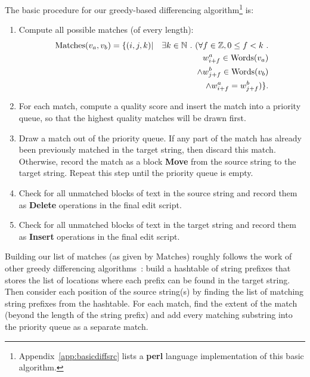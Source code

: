 The basic procedure for our greedy-based differencing
algorithm\footnote{Appendix~\ref{app:basicdiffsrc} lists a
\textbf{perl} language implementation of this basic algorithm.}
is:
\begin{enumerate}
\item Compute all possible matches (of every length):
\begin{eqnarray*}
\mathrm{Matches}(v_{a}, v_{b}) = \{ (i,j,k) & |
            & \exists k \in \mathbb{N} \ .\  (
    \forall f \in \mathbb{Z}, 0 \le f < k \ . \\
    & & w^a_{i+f} \in \mathrm{Words}(v_{a}) \\
    & & \wedge w^b_{j+f} \in \mathrm{Words}(v_{b}) \\
    & & \wedge w^a_{i+f} = w^b_{j+f} ) \}.
\end{eqnarray*}

\item For each match, compute a quality score and insert the match into
    a priority queue, so that the highest quality matches will
    be drawn first.
\item Draw a match out of the priority queue.
    If any part of the match has already been previously matched
    in the target string, then discard this match.
    Otherwise, record the match as a block \textbf{Move}
    from the source string to the target string.
    Repeat this step until the priority queue is empty.
\item Check for all unmatched blocks of text in the source
    string and record them as \textbf{Delete} operations
    in the final edit script.
\item Check for all unmatched blocks of text in the target
    string and record them as \textbf{Insert} operations
    in the final edit script.
\end{enumerate}

Building our list of matches (as given by $\mathrm{Matches}$)
roughly follows the work of other greedy differencing
algorithms~\cite{Reichenberger1991,Burns1997}:
build a hashtable of string prefixes that stores the list
of locations where each prefix can be found in the target string.
Then consider each position of the source string(s) by finding
the list of matching string prefixes from the hashtable.
For each match, find the extent of the match
(beyond the length of the string prefix)
and add every matching substring into the priority queue
as a separate match.

